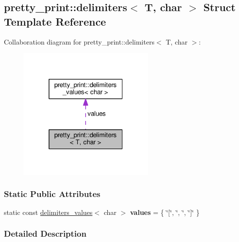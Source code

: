 \hypertarget{structpretty__print_1_1delimiters_3_01T_00_01char_01_4}{}\subsection{pretty\+\_\+print\+:\+:delimiters$<$ T, char $>$ Struct Template Reference}
\label{structpretty__print_1_1delimiters_3_01T_00_01char_01_4}


Collaboration diagram for pretty\+\_\+print\+:\+:delimiters$<$ T, char $>$\+:
\nopagebreak
\begin{figure}[H]
\begin{center}
\leavevmode
\includegraphics[width=193pt]{structpretty__print_1_1delimiters_3_01T_00_01char_01_4__coll__graph}
\end{center}
\end{figure}
\subsubsection*{Static Public Attributes}
\begin{DoxyCompactItemize}
\item 
static const \hyperlink{structpretty__print_1_1delimiters__values}{delimiters\+\_\+values}$<$ char $>$ {\bfseries values} = \{ \char`\"{}\mbox{[}\char`\"{}, \char`\"{}, \char`\"{}, \char`\"{}\mbox{]}\char`\"{} \}\hypertarget{structpretty__print_1_1delimiters_3_01T_00_01char_01_4_ac5681913d85aa5a660e0ee0d0e556dc7}{}\label{structpretty__print_1_1delimiters_3_01T_00_01char_01_4_ac5681913d85aa5a660e0ee0d0e556dc7}

\end{DoxyCompactItemize}


\subsubsection{Detailed Description}
